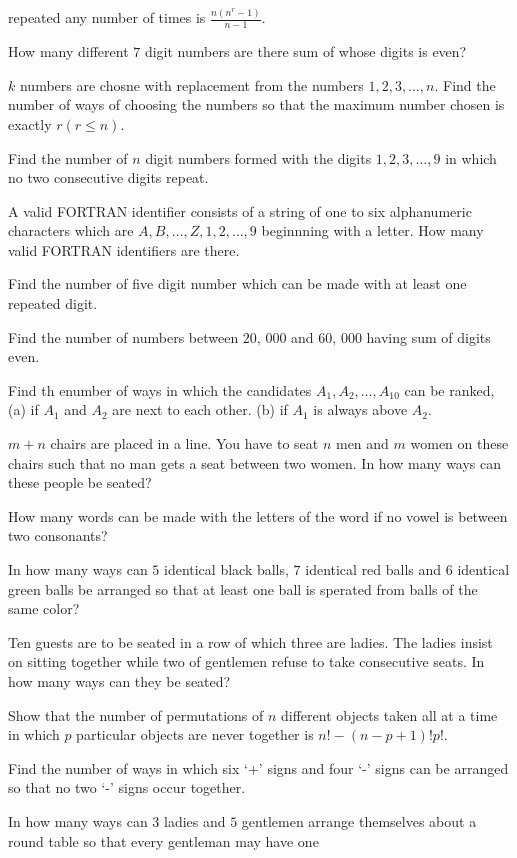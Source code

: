   repeated any number of times is $\frac{n(n^r - 1)}{n - 1}$.
\item How many different $7$ digit numbers are there sum of whose digits is even?
\item $k$ numbers are chosne with replacement from the numbers $1, 2, 3, \ldots, n$. Find the number of ways of choosing the
  numbers so that the maximum number chosen is exactly $r (r\leq n)$.
\item Find the number of $n$ digit numbers formed with the digits $1, 2, 3, \ldots, 9$ in which no two consecutive digits repeat.
\item A valid FORTRAN identifier consists of a string of one to six alphanumeric characters which are $A, B, \ldots, Z, 1, 2,
  \ldots, 9$ beginnning with a letter. How many valid FORTRAN identifiers are there.
\item Find the number of five digit number which can be made with at least one repeated digit.
\item Find the number of numbers between $20,\,000$ and $60,\,000$ having sum of digits even.
\item Find th enumber of ways in which the candidates $A_1, A_2, \ldots, A_{10}$ can be ranked, (a) if $A_1$ and $A_2$ are next to
  each other. (b) if $A_1$ is always above $A_2$.
\item $m + n$ chairs are placed in a line. You have to seat $n$ men and $m$ women on these chairs such that no man gets a seat
  between two women. In how many ways can these people be seated?
\item How many words can be made with the letters of the word  if no vowel is between two consonants?
\item In how many ways can $5$ identical black balls, $7$ identical red balls and $6$ identical green balls be arranged so that at
  least one ball is sperated from balls of the same color?
\item Ten guests are to be seated in a row of which three are ladies. The ladies insist on sitting together while two of gentlemen
  refuse to take consecutive seats. In how many ways can they be seated?
\item Show that the number of permutations of $n$ different objects taken all at a time in which $p$ particular objects are never
  together is $n! - (n - p + 1)!p!$.
\item Find the number of ways in which six `+' signs and four `-' signs can be arranged so that no two `-' signs occur together.
\item In how many ways can $3$ ladies and $5$ gentlemen arrange themselves about a round table so that every gentleman may have one
